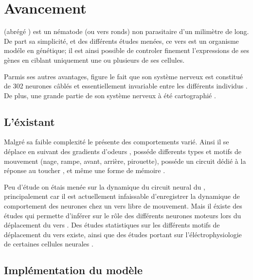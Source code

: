 \chapter{Avancement} %
\label{cha:Avancement}

\caeleg{} (abrégé \celeg{}) est un nématode (ou vers ronds) non parasitaire d'un milimètre de long.
De part sa simplicité, et des différents études menées, ce vers est un organisme modéle en génétique;
il est ainsi possible de controler finement l'expressions de ses gènes en ciblant uniquement une ou
plusieurs de ses cellules.

Parmis ses autres avantages, figure le fait que son système nerveux est constitué de 302
neurones câblés et essentiellement invariable entre les différents individus \cite{Boyle2009}.
De plus, une grande partie de son système nerveux à été cartographié
\cite{Durbin1987,Gray2005,Boyle2009,Varshney2011}.

\section{L'éxistant} %
\label{sec:L'éxistant}

Malgré sa faible complexité le \celeg{} présente des comportements varié. Ainsi il se déplace
en suivant des gradients d'odeurs \cite{Ferree1999,Gray2005}, posséde differents types et
motifs de mouvement (nage, rampe, avant, arrière, pirouette), posséde un circuit dédié à la 
réponse au toucher \cite{Chalfie1985}, et même une forme de mémoire \cite{Rankin2005a}.

Peu d'étude on étais menée sur la dynamique du circuit neural du \celeg{}, principalement
car il est actuellement infaissable d'enregistrer la dynamique de comportement des neurones
chez un vers libre de mouvement.
Mais il éxiste des études qui permette d'inférer sur le rôle des différents neurones moteurs
lors du déplacement du vers \cite{Yanik2006,Chronis2007,Leifer2011}.
Des études statistiques sur les différents motifs de déplacement \cite{Gray2005} du vers existe, ainsi que
des études portant sur l'éléctrophysiologie de certaines cellules neurales \cite{Mellem2008a,Lockery2009}.


\section{Implémentation du modèle} %
\label{sub:Implémentation du modèle}

